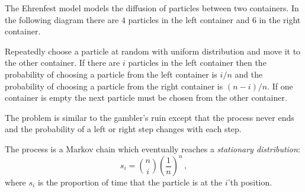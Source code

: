 \documentclass[11pt,a4paper]{article}
\newcommand*{\dischoose}[2]{\displaystyle{#1 \choose #2}}
\begin{document}
The Ehrenfest model models the diffusion of particles between two containers. In the following diagram there are $4$ particles in the left container and $6$ in the right container.
\begin{center}
\end{center}
Repeatedly choose a particle at random with uniform distribution and move it to the other container. If there are $i$ particles in the left container then the probability of choosing a particle from the left container is $i/n$ and the probability of choosing a particle from the right container is $(n-i)/n$. If one container is empty the next particle must be chosen from the other container. 
\begin{center}
\end{center}
The problem is similar to the gambler's ruin except that the process never ends and the probability of a left or right step changes with each step.

The process is a Markov chain which eventually reaches a \emph{stationary distribution}:
\[
s_i=\dischoose{n}{i}\left(\frac{1}{n}\right)^n\,,
\]
where $s_i$ is the proportion of time that the particle is at the $i$'th position.
\end{document}
